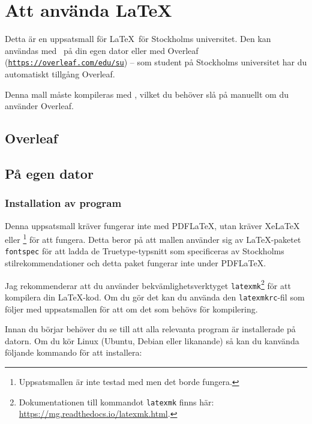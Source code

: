 
\section{Att använda \LaTeX}
\label{latex}

Detta är en uppsatsmall för \LaTeX\ för Stockholms universitet. Den kan
användas med \XeLaTeX\ på din egen dator eller med Overleaf
(\texttt{\href{https://overleaf.com/edu/su}{https://\linebreak[0]{}overleaf\linebreak[0]{}.com/\linebreak[0]{}edu/\linebreak[0]{}su}})
-- som student på Stockholms universitet har du automatiskt tillgång Overleaf.

Denna mall måste kompileras med \XeLaTeX, vilket du behöver slå på manuellt om
du använder Overleaf.

\subsection{Overleaf}


\subsection{På egen dator}

\subsubsection{Installation av program}

Denna uppsatsmall kräver fungerar inte med PDF\LaTeX, utan kräver XeLaTeX eller
\LuaLaTeX\footnote{Uppsatsmallen är inte testad med \LuaLaTeX{} men det borde
  fungera.} för att fungera. Detta beror på att mallen använder sig av
\LaTeX-paketet \texttt{fontspec} för att ladda de Truetype-typsnitt som
specificeras av Stockholms stilrekommendationer och detta paket fungerar inte
under PDF\LaTeX.

Jag rekommenderar att du använder bekvämlighetsverktyget
\texttt{latexmk}\footnote{Dokumentationen till kommandot \texttt{latexmk} finns
  här: \url{https://mg.readthedocs.io/latexmk.html}. } för att kompilera din
\LaTeX-kod. Om du gör det kan du använda den \texttt{latexmkrc}-fil som följer
med uppsatsmallen för att om det som behövs för kompilering.

Innan du börjar behöver du se till att alla relevanta program är installerade
på datorn. Om du kör Linux (Ubuntu, Debian eller likanande) så kan du kanvända
följande kommando för att installera:

